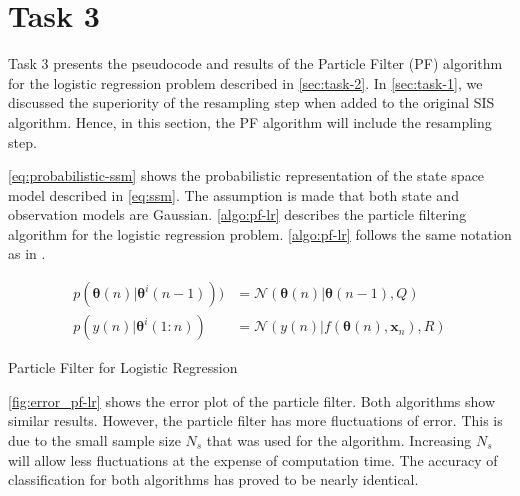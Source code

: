 \documentclass{article}
\begin{document}
\section{Task 3}

Task 3 presents the pseudocode and results of the Particle Filter (PF) algorithm for the logistic regression problem described in \cref{sec:task-2}. In \cref{sec:task-1}, we discussed the superiority of the resampling step when added to the original SIS algorithm. Hence, in this section, the PF algorithm will include the resampling step.

\cref{eq:probabilistic-ssm} shows the probabilistic representation of the state space model described in \cref{eq:ssm}. The assumption is made that both state and observation models are Gaussian. \cref{algo:pf-lr} describes the particle filtering algorithm for the logistic regression problem. \cref{algo:pf-lr} follows the same notation as in \cite{lecture6}.

\begin{equation}
    \begin{split}
        p(\pmb{\theta}(n) | \pmb{\theta}^i (n-1))) &= \mathcal{N} (\pmb{\theta}(n) | \pmb{\theta}(n-1), Q)\\
        p(y(n) | \pmb{\theta}^i(1:n)) &= \mathcal{N} (y(n) | f(\pmb{\theta}(n), \pmb{x}_n), R) 
    \end{split}
    \label{eq:probabilistic-ssm}
\end{equation}


\begin{algorithm}[H]
    \SetAlgoLined
     \caption{Particle Filter for Logistic Regression}
     \label{algo:pf-lr}
\end{algorithm}

\cref{fig:error_pf-lr} shows the error plot of the particle filter. Both algorithms show similar results. However, the particle filter has more fluctuations of error. This is due to the small sample size $N_s$ that was used for the algorithm. Increasing $N_s$ will allow less fluctuations at the expense of computation time. The accuracy of classification for both algorithms has proved to be nearly identical.
\end{document}
